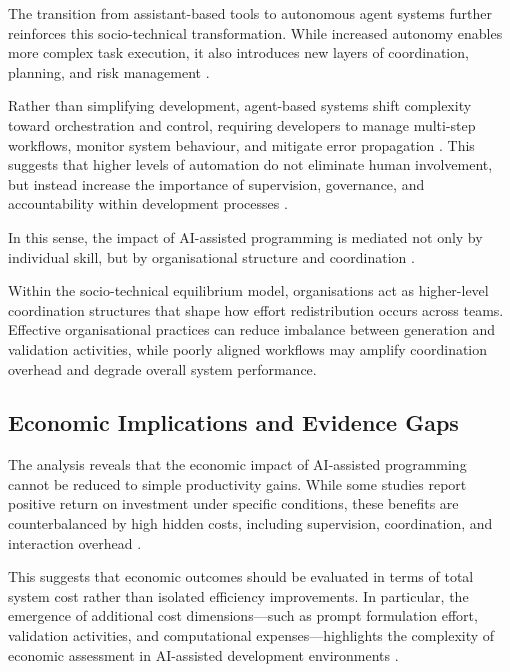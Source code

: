 \documentclass[conference]{IEEEtran}
\begin{document}
The transition from assistant-based tools to autonomous agent systems further reinforces this socio-technical transformation. While increased autonomy enables more complex task execution, it also introduces new layers of coordination, planning, and risk management \cite{liu_e2edev_2026, yin_comprehensive_2025}.

Rather than simplifying development, agent-based systems shift complexity toward orchestration and control, requiring developers to manage multi-step workflows, monitor system behaviour, and mitigate error propagation \cite{gong_how_2025, he_speed_2026}. This suggests that higher levels of automation do not eliminate human involvement, but instead increase the importance of supervision, governance, and accountability within development processes \cite{gong_how_2025, he_speed_2026}.

In this sense, the impact of AI-assisted programming is mediated not only by individual skill, but by organisational structure and coordination \cite{lyu_will_2025}.

Within the socio-technical equilibrium model, organisations act as higher-level coordination structures that shape how effort redistribution occurs across teams. Effective organisational practices can reduce imbalance between generation and validation activities, while poorly aligned workflows may amplify coordination overhead and degrade overall system performance.

\subsection{Economic Implications and Evidence Gaps}

The analysis reveals that the economic impact of AI-assisted programming cannot be reduced to simple productivity gains. While some studies report positive return on investment under specific conditions, these benefits are counterbalanced by high hidden costs, including supervision, coordination, and interaction overhead \cite{rodriguez_comparative_2025, song_impact_2024, yin_comprehensive_2025}.

This suggests that economic outcomes should be evaluated in terms of total system cost rather than isolated efficiency improvements. In particular, the emergence of additional cost dimensions—such as prompt formulation effort, validation activities, and computational expenses—highlights the complexity of economic assessment in AI-assisted development environments \cite{nam_understanding_2025, nascimento_comparing_2023}.
\end{document}
